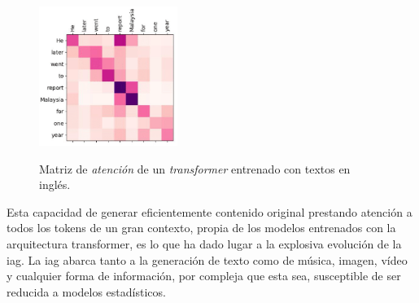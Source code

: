 \begin{figure}[H]
    \caption[Matriz de \emph{atención} de un \emph{transformer} entrenado con textos en inglés]{Matriz de \emph{atención} de un \emph{transformer} entrenado con textos en inglés.}
    \centering
    \includegraphics[width=0.4\textwidth]{./figuras/Transformer_attention_matrix.png}
    \label{fig:transformer_attention}
\end{figure}

Esta capacidad de generar eficientemente contenido original prestando atención a todos los tokens de un gran contexto, propia de los modelos entrenados con la arquitectura transformer, es lo que ha dado lugar a la explosiva evolución de la \gls{iag}. La \gls{iag} abarca tanto a la generación de texto como de música, imagen, vídeo y cualquier forma de información, por compleja que esta sea, susceptible de ser reducida a modelos estadísticos.